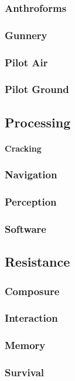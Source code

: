 \subsubsection{Anthroforms}

\subsubsection{Gunnery}

\subsubsection{Pilot Air}

\subsubsection{Pilot Ground}

\subsection{Processing}

\paragraph{Cracking}

\subsubsection{Navigation}

\subsubsection{Perception}

\subsubsection{Software}


\subsection{Resistance}

\subsubsection{Composure}

\subsubsection{Interaction}

\subsubsection{Memory}

\subsubsection{Survival}



